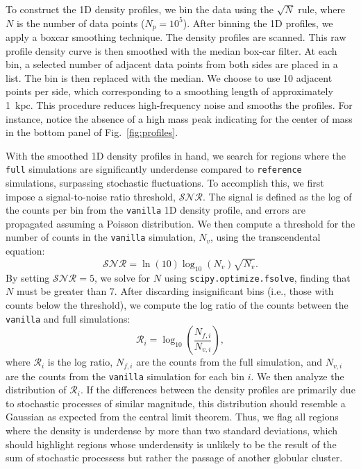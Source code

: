 \documentclass{aa}
\begin{document}
\begin{appendix}
    To construct the 1D density profiles, we bin the data using the $\sqrt{N}$ rule, where $N$ is the number of data points ($N_p = 10^5$). After binning the 1D profiles, we apply a boxcar smoothing technique. The density profiles are scanned. This raw profile density curve is then smoothed with the median box-car filter. At each bin, a selected number of adjacent data points from both sides are placed in a list. The bin is then replaced with the median. We choose to use 10 adjacent points per side, which corresponding to a smoothing length of approximately 1~kpc. This procedure reduces high-frequency noise and smooths the profiles. For instance, notice the absence of a high mass peak indicating for the center of mass in the bottom panel of Fig.~\ref{fig:profiles}.

    With the smoothed 1D density profiles in hand, we search for regions where the \texttt{full} simulations are significantly underdense compared to \texttt{reference} simulations, surpassing stochastic fluctuations. To accomplish this, we first impose a signal-to-noise ratio threshold, $\mathcal{SNR}$. The signal is defined as the log of the counts per bin from the \texttt{vanilla} 1D density profile, and errors are propagated assuming a Poisson distribution. We then compute a threshold for the number of counts in the \texttt{vanilla} simulation, $N_v$, using the transcendental equation:
    \begin{equation}
        \mathcal{SNR} = \ln(10) \log_{10}\left(N_v\right) \sqrt{N_v}.
      \end{equation} \label{eq:density_threshold}
    By setting $\mathcal{SNR} = 5$, we solve for $N$ using \texttt{scipy.optimize.fsolve}, finding that $N$ must be greater than 7. After discarding insignificant bins (i.e., those with counts below the threshold), we compute the log ratio of the counts between the \texttt{vanilla} and full simulations:
    \begin{equation}
        \mathcal{R}_i = \log_{10}\left(\frac{N_{f,i}}{N_{v,i}}\right),
      \end{equation}
    where $\mathcal{R}_i$ is the log ratio, $N_{f,i}$ are the counts from the full simulation, and $N_{v,i}$ are the counts from the \texttt{vanilla} simulation for each bin $i$. We then analyze the distribution of $\mathcal{R}_i$. If the differences between the density profiles are primarily due to stochastic processes of similar magnitude, this distribution should resemble a Gaussian as expected from the central limit theorem. Thus, we flag all regions where the density is underdense by more than two standard deviations, which should highlight regions whose underdensity is unlikely to be the result of the sum of stochastic processess but rather the passage of another globular cluster. 


\end{appendix}
\end{document}
